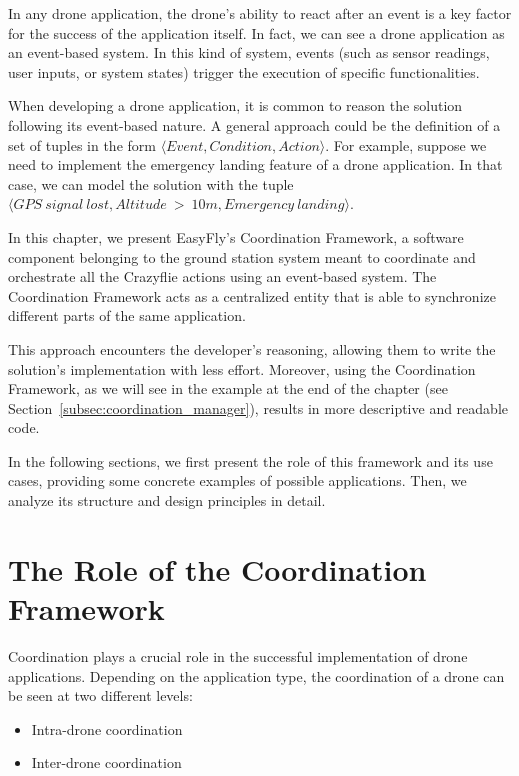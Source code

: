 In any drone application, the drone's ability to react after an event is a key factor for the success of the application itself. 
In fact, we can see a drone application as an event-based system. 
In this kind of system, events (such as sensor readings, user inputs, or system states) trigger the execution of specific functionalities.

When developing a drone application, it is common to reason the solution following its event-based nature.
A general approach could be the definition of a set of tuples in the form \( \langle Event, Condition, Action \rangle \).
For example, suppose we need to implement the emergency landing feature of a drone application. 
In that case, we can model the solution with the tuple \( \langle GPS~signal~lost, Altitude~>~10m, Emergency~landing \rangle \).

In this chapter, we present EasyFly's Coordination Framework, a software component belonging to the ground station system meant to coordinate and orchestrate all the Crazyflie actions using an event-based system.
The Coordination Framework acts as a centralized entity that is able to synchronize different parts of the same application.

This approach encounters the developer's reasoning, allowing them to write the solution's implementation with less effort. 
Moreover, using the Coordination Framework, as we will see in the example at the end of the chapter (see Section~\ref{subsec:coordination_manager}), results in more descriptive and readable code.

In the following sections, we first present the role of this framework and its use cases, providing some concrete examples of possible applications. 
Then, we analyze its structure and design principles in detail.

\section{The Role of the Coordination Framework}\label{sec:coordination_framework_role}

Coordination plays a crucial role in the successful implementation of drone applications. 
Depending on the application type, the coordination of a drone can be seen at two different levels:
\begin{itemize}
    \item Intra-drone coordination
    \item Inter-drone coordination
\end{itemize}

